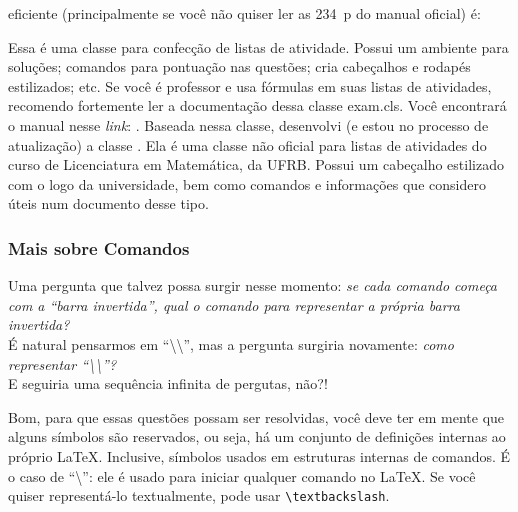 \begin{description}
                   eficiente (principalmente se você não quiser ler as 234~p do 
                   manual oficial) é: 
  \item[\textas{exam}] Essa é uma classe para confecção de listas de atividade.
                   Possui um ambiente para soluções; comandos para pontuação nas
                   questões; cria cabeçalhos e rodapés estilizados; etc.
                   Se você é professor e usa fórmulas em suas listas de 
                   atividades, recomendo fortemente ler a documentação dessa 
                   classe \textsf{exam.cls}.
                   Você encontrará o manual nesse \textit{link}:
                   .
                   \newline
                   Baseada nessa classe, desenvolvi (e estou no processo de 
                   atualização) a classe .
                   Ela é uma classe não oficial para listas de atividades do 
                   curso de Licenciatura em Matemática, da UFRB.
                   Possui um cabeçalho estilizado com o logo da universidade, bem
                   como comandos e informações que considero úteis num documento
                   desse tipo.
\end{description}

% 
  \subsubsection{Mais sobre Comandos}
% 

Uma pergunta que talvez possa surgir nesse momento: 
\textit{
  se cada comando começa com a ``barra invertida'', qual o comando para 
  representar a própria barra invertida? 
}
  \\
É natural pensarmos em ``\textbackslash\textbackslash'', mas a pergunta surgiria 
novamente: 
\textit{ 
  como representar ``\textbackslash\textbackslash''?
} \\
E seguiria uma sequência infinita de pergutas, não?!

Bom, para que essas questões possam ser resolvidas, você deve ter em mente que 
alguns símbolos são \textsf{reservados}, ou seja, há um conjunto de definições 
internas ao próprio \LaTeX. 
Inclusive, símbolos usados em estruturas internas de comandos. 
É o caso de ``\textbackslash'': ele é usado para iniciar qualquer comando no \LaTeX. 
Se você quiser representá-lo textualmente, pode usar \texttt{\textbackslash textbackslash}.

